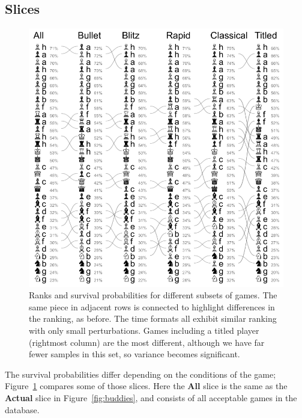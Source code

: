 \documentclass[twocolumn]{article}
\begin{document}
\subsection{Slices} \label{sec:slices}

\begin{figure}
  \includegraphics[width=\linewidth]{slices}
  \caption{
    Ranks and survival probabilities for different subsets of games.
    The same piece in adjacent rows is connected to highlight
    differences in the ranking, as before. The time formats all
    exhibit similar ranking with only small perturbations. Games
    including a titled player (rightmost column) are the most
    different, although we have far fewer samples in this set,
    so variance becomes significant.
  } \label{fig:slices}
\end{figure}

The survival probabilities differ depending on the conditions of the
game; Figure~\ref{fig:slices} compares some of those slices. Here the
{\bf All} slice is the same as the {\bf Actual} slice in
Figure~\ref{fig:buddies}, and consists of all acceptable games in the
database.
\end{document}
